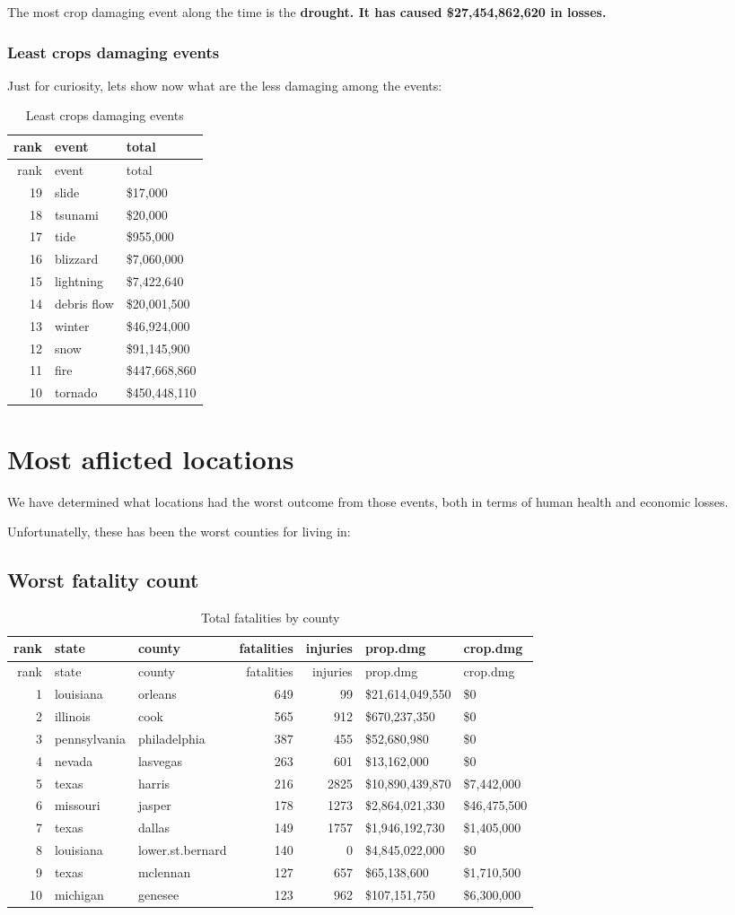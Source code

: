 \documentclass[]{article}
\begin{document}
The most crop damaging event along the time is the \textbf{drought. It
has caused \$27,454,862,620 in losses.}

\subsubsection{Least crops damaging
events}\label{least-crops-damaging-events}

Just for curiosity, lets show now what are the less damaging among the
events:

\begin{longtable}[]{@{}rll@{}}
\caption{Least crops damaging events}\tabularnewline
\toprule
rank & event & total\tabularnewline
\midrule
\endfirsthead
\toprule
rank & event & total\tabularnewline
\midrule
\endhead
19 & slide & \$17,000\tabularnewline
18 & tsunami & \$20,000\tabularnewline
17 & tide & \$955,000\tabularnewline
16 & blizzard & \$7,060,000\tabularnewline
15 & lightning & \$7,422,640\tabularnewline
14 & debris flow & \$20,001,500\tabularnewline
13 & winter & \$46,924,000\tabularnewline
12 & snow & \$91,145,900\tabularnewline
11 & fire & \$447,668,860\tabularnewline
10 & tornado & \$450,448,110\tabularnewline
\bottomrule
\end{longtable}

\section{Most aflicted locations}\label{most-aflicted-locations}

We have determined what locations had the worst outcome from those
events, both in terms of human health and economic losses.

Unfortunatelly, these has been the worst counties for living in:

\subsection{Worst fatality count}\label{worst-fatality-count}

\begin{longtable}[]{@{}rllrrll@{}}
\caption{Total fatalities by county}\tabularnewline
\toprule
rank & state & county & fatalities & injuries & prop.dmg &
crop.dmg\tabularnewline
\midrule
\endfirsthead
\toprule
rank & state & county & fatalities & injuries & prop.dmg &
crop.dmg\tabularnewline
\midrule
\endhead
1 & louisiana & orleans & 649 & 99 & \$21,614,049,550 &
\$0\tabularnewline
2 & illinois & cook & 565 & 912 & \$670,237,350 & \$0\tabularnewline
3 & pennsylvania & philadelphia & 387 & 455 & \$52,680,980 &
\$0\tabularnewline
4 & nevada & lasvegas & 263 & 601 & \$13,162,000 & \$0\tabularnewline
5 & texas & harris & 216 & 2825 & \$10,890,439,870 &
\$7,442,000\tabularnewline
6 & missouri & jasper & 178 & 1273 & \$2,864,021,330 &
\$46,475,500\tabularnewline
7 & texas & dallas & 149 & 1757 & \$1,946,192,730 &
\$1,405,000\tabularnewline
8 & louisiana & lower.st.bernard & 140 & 0 & \$4,845,022,000 &
\$0\tabularnewline
9 & texas & mclennan & 127 & 657 & \$65,138,600 &
\$1,710,500\tabularnewline
10 & michigan & genesee & 123 & 962 & \$107,151,750 &
\$6,300,000\tabularnewline
\bottomrule
\end{longtable}
\end{document}
